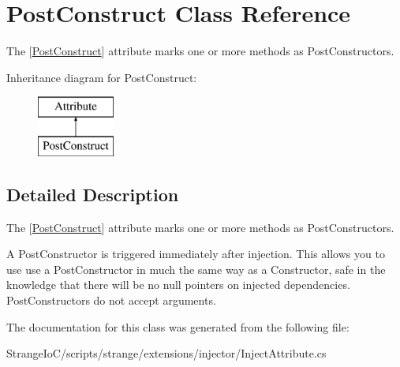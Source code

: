 \hypertarget{class_post_construct}{\section{Post\-Construct Class Reference}
\label{class_post_construct}
}


The {\ttfamily \mbox{[}\hyperlink{class_post_construct}{Post\-Construct}\mbox{]}} attribute marks one or more methods as Post\-Constructors.  


Inheritance diagram for Post\-Construct\-:\begin{figure}[H]
\begin{center}
\leavevmode
\includegraphics[height=2.000000cm]{class_post_construct}
\end{center}
\end{figure}


\subsection{Detailed Description}
The {\ttfamily \mbox{[}\hyperlink{class_post_construct}{Post\-Construct}\mbox{]}} attribute marks one or more methods as Post\-Constructors. 

A Post\-Constructor is triggered immediately after injection. This allows you to use use a Post\-Constructor in much the same way as a Constructor, safe in the knowledge that there will be no null pointers on injected dependencies. Post\-Constructors do not accept arguments. 

The documentation for this class was generated from the following file\-:\begin{DoxyCompactItemize}
\item 
Strange\-Io\-C/scripts/strange/extensions/injector/Inject\-Attribute.\-cs\end{DoxyCompactItemize}
